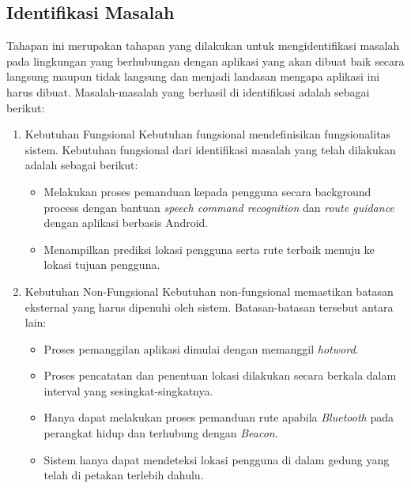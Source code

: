 \subsection{Identifikasi Masalah}
Tahapan ini merupakan tahapan yang dilakukan untuk mengidentifikasi masalah pada lingkungan yang berhubungan dengan aplikasi yang akan dibuat baik secara langsung maupun tidak langsung dan menjadi landasan mengapa aplikasi ini harus dibuat. Masalah-masalah yang berhasil di identifikasi adalah sebagai berikut:

\begin{enumerate}
\item Kebutuhan Fungsional
Kebutuhan fungsional mendefinisikan fungsionalitas sistem. Kebutuhan fungsional dari identifikasi masalah yang telah dilakukan adalah sebagai berikut:

\begin{itemize}
\item Melakukan proses pemanduan kepada pengguna secara background process dengan bantuan \textit{speech command recognition} dan \textit{route guidance} dengan aplikasi berbasis Android.

\item Menampilkan prediksi lokasi pengguna serta rute terbaik menuju ke lokasi tujuan pengguna.

\end{itemize}

\item Kebutuhan Non-Fungsional
Kebutuhan non-fungsional memastikan batasan eksternal yang harus dipenuhi oleh sistem. Batasan-batasan tersebut antara lain:

\begin{itemize}
\item Proses pemanggilan aplikasi dimulai dengan memanggil \textit{hotword}.

\item Proses pencatatan dan penentuan lokasi dilakukan secara berkala dalam interval yang sesingkat-singkatnya.

\item Hanya dapat melakukan proses pemanduan rute apabila \textit{Bluetooth} pada perangkat hidup dan terhubung dengan \textit{Beacon}.

\item Sistem hanya dapat mendeteksi lokasi pengguna di dalam gedung yang telah di petakan terlebih dahulu.

\end{itemize}

\end{enumerate}

